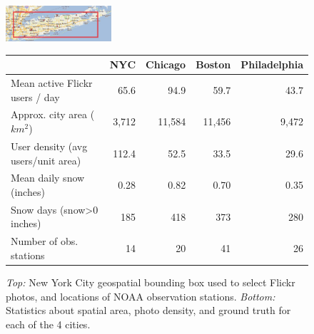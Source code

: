 \begin{figure}
\begin{center}
\includegraphics[width=0.35\textwidth]{plots/nyc_stations.png} 
\end{center}
%
%
%
\begin{center}
{\small{
\newcommand{\spc}{\hspace{2pt}}
\begin{tabular} {|@{\spc}l@{\spc}|@{\spc}r@{\spc}|@{\spc}r@{\spc}|@{\spc}r@{\spc}|@{\spc}r@{\spc}|} 
\hline 
\textbf{} &{NYC}  &{Chicago} &{Boston}&{Philadelphia} \tabularnewline
\hline 
{Mean active Flickr users / day} &{65.6} &{94.9} &{59.7} &{43.7} \tabularnewline
\hline 
{Approx. city area ($km^2$)} &{3,712} &{11,584} &{11,456} &{9,472}  \tabularnewline
\hline 
{User density (avg users/unit area)} &{112.4} &{52.5} &{33.5} &{29.6} \tabularnewline
\hline 
{Mean daily snow (inches)} &{0.28} &{0.82} &{0.70} &{0.35} \tabularnewline
\hline 
{Snow days (snow>0 inches)} &{185} &{418} &{373} &{280} \tabularnewline
\hline 
{Number of obs. stations} &{14} &{20} &{41} &{26} \tabularnewline
\hline 
\end{tabular}}}
\end{center}
\vspace{-12pt}
 \caption {\textit{Top:} New York City geospatial bounding box used to select Flickr photos, and locations of NOAA observation stations. \textit{Bottom:} Statistics about spatial area, photo density, and ground truth for each of the 4 cities.}
\label{tab:city_statistics} 
\end{figure}


